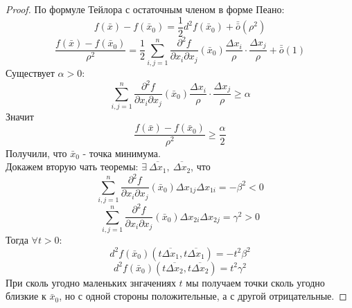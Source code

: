 \begin{proof} По формуле Тейлора с остаточным членом в форме Пеано:
    \[f(\bar{x})-f(\bar{x}_0)=\frac{1}{2}d^2f(\bar{x}_0)+\bar{\bar{o}}{(\rho^2)}\]
    \[\frac{f(\bar{x})-f(\bar{x}_0)}{\rho^2}=\frac{1}{2}\sum\limits_{i,j=1}^{n}\frac{\partial^2 {f}}{\partial {x_i} \partial x_j}(\bar{x}_0)\frac{\Delta x_i}{\rho}\cdot \frac{\Delta x_j}{\rho}+\bar{\bar{o}}{(1)}\]
    Существует $\alpha>0$: 
    \[\sum\limits_{i,j=1}^{n}\frac{\partial^2 {f}}{\partial {x_i}\partial x_j}(\bar{x}_0) \frac{\Delta x_i}{\rho}\cdot \frac{\Delta x_j}{\rho}\geq \alpha\]
    Значит
    \[\frac{f(\bar{x})-f(\bar{x}_0)}{\rho^2}\geq \frac{\alpha}{2}\]
    Получили, что $\bar{x}_0$ - точка минимума.\\
    Докажем вторую чать теоремы: $\exists\ \overline{\Delta x_1},\ \overline{\Delta x_2}$, что
    \[\sum\limits_{i,j=1}^{n}\frac{\partial^2 {f}}{\partial {x_i} \partial x_j}(\bar{x}_0)\Delta x_{1j}\Delta x_{1i}=-\beta^2<0\]
    \[\sum\limits_{i,j=1}^{n}\frac{\partial^2 {f}}{\partial {x_i} \partial x_j}(\bar{x}_0)\Delta x_{2i}\Delta x_{2j}=\gamma^2>0\]
    Тогда $\forall t>0$:
    \[d^2f(\bar{x}_0)(t \overline{\Delta x_1}, t\overline{\Delta x_1})=-t^2\beta^2\]
    \[d^2f(\bar{x}_0)(t \overline{\Delta x_2}, t\overline{\Delta x_2})=t^2\gamma^2\]
    При сколь угодно маленьких знгачениях $t$ мы получаем точки сколь угодно близкие к $\bar{x}_0$, но с одной стороны положительные, а с другой отрицательные.
\end{proof} 
